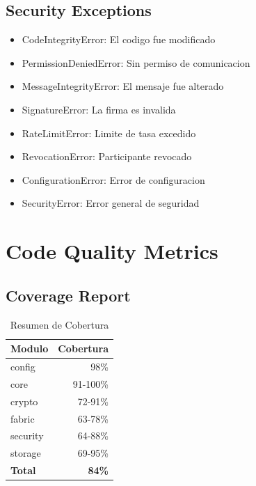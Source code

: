 \documentclass[12pt,a4paper]{report}
\newcommand{\class}[1]{\textsf{#1}}
\begin{document}
\begin{appendices}
\section{Security Exceptions}

\begin{itemize}
    \item \class{CodeIntegrityError}: El codigo fue modificado
    \item \class{PermissionDeniedError}: Sin permiso de comunicacion
    \item \class{MessageIntegrityError}: El mensaje fue alterado
    \item \class{SignatureError}: La firma es invalida
    \item \class{RateLimitError}: Limite de tasa excedido
    \item \class{RevocationError}: Participante revocado
    \item \class{ConfigurationError}: Error de configuracion
    \item \class{SecurityError}: Error general de seguridad
\end{itemize}

\chapter{Code Quality Metrics}
\cleardoublepage

\section{Coverage Report}

\begin{table}[H]
    \centering
    \begin{tabular}{lr}
        \toprule
        \textbf{Modulo} & \textbf{Cobertura} \\
        \midrule
        config & 98\% \\
        core & 91-100\% \\
        crypto & 72-91\% \\
        fabric & 63-78\% \\
        security & 64-88\% \\
        storage & 69-95\% \\
        \midrule
        \textbf{Total} & \textbf{84\%} \\
        \bottomrule
    \end{tabular}
    \caption{Resumen de Cobertura}
\end{table}


\end{appendices}
\end{document}
